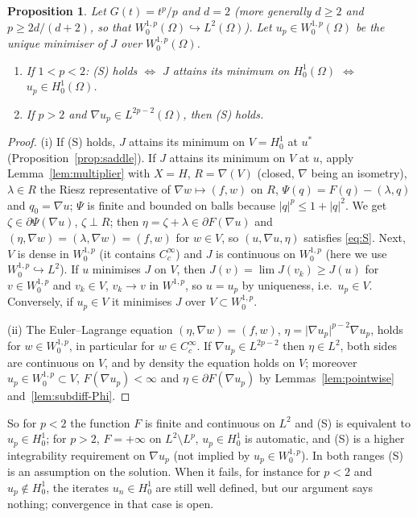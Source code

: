 \documentclass[11pt]{amsart}
\newtheorem{proposition}[theorem]{Proposition}
\theoremstyle{definition}
\theoremstyle{remark}
\numberwithin{equation}{section}
\newcommand{\abs}[1]{\lvert #1\rvert}
\begin{document}
\begin{proposition}\label{prop:S-p}
Let $G(t)=t^p/p$ and $d=2$ \textup(more generally $d\ge2$ and $p\ge2d/(d+2)$, so that $W^{1,p}_0(\Omega)\hookrightarrow L^2(\Omega)$\textup). Let $u_p\in W^{1,p}_0(\Omega)$ be the unique minimiser of $J$ over $W^{1,p}_0(\Omega)$.
\begin{enumerate}[label=\textup{(\roman*)}]
\item If $1<p<2$: \textup{(S)} holds $\iff$ $J$ attains its minimum on $H^1_0(\Omega)$ $\iff$ $u_p\in H^1_0(\Omega)$.
\item If $p>2$ and $\nabla u_p\in L^{2p-2}(\Omega)$, then \textup{(S)} holds.
\end{enumerate}
\end{proposition}
\begin{proof}
(i) If (S) holds, $J$ attains its minimum on $V=H^1_0$ at $u^*$ (Proposition~\ref{prop:saddle}). If $J$ attains its minimum on $V$ at $u$, apply Lemma~\ref{lem:multiplier} with $X=H$, $R=\nabla(V)$ (closed, $\nabla$ being an isometry), $\lambda\in R$ the Riesz representative of $\nabla w\mapsto(f,w)$ on $R$, $\Psi(q)=F(q)-(\lambda,q)$ and $q_0=\nabla u$; $\Psi$ is finite and bounded on balls because $\abs q^p\le1+\abs q^2$. We get $\zeta\in\partial\Psi(\nabla u)$, $\zeta\perp R$; then $\eta=\zeta+\lambda\in\partial F(\nabla u)$ and $(\eta,\nabla w)=(\lambda,\nabla w)=(f,w)$ for $w\in V$, so $(u,\nabla u,\eta)$ satisfies \eqref{eq:S}. Next, $V$ is dense in $W^{1,p}_0$ (it contains $C^\infty_c$) and $J$ is continuous on $W^{1,p}_0$ (here we use $W^{1,p}_0\hookrightarrow L^2$). If $u$ minimises $J$ on $V$, then $J(v)=\lim J(v_k)\ge J(u)$ for $v\in W^{1,p}_0$ and $v_k\in V$, $v_k\to v$ in $W^{1,p}$, so $u=u_p$ by uniqueness, i.e.\ $u_p\in V$. Conversely, if $u_p\in V$ it minimises $J$ over $V\subset W^{1,p}_0$.

(ii) The Euler--Lagrange equation $(\eta,\nabla w)=(f,w)$, $\eta=\abs{\nabla u_p}^{p-2}\nabla u_p$, holds for $w\in W^{1,p}_0$, in particular for $w\in C^\infty_c$. If $\nabla u_p\in L^{2p-2}$ then $\eta\in L^2$, both sides are continuous on $V$, and by density the equation holds on $V$; moreover $u_p\in W^{1,p}_0\subset V$, $F(\nabla u_p)<\infty$ and $\eta\in\partial F(\nabla u_p)$ by Lemmas~\ref{lem:pointwise} and~\ref{lem:subdiff-Phi}.
\end{proof}

So for $p<2$ the function $F$ is finite and continuous on $L^2$ and (S) is equivalent to $u_p\in H^1_0$; for $p>2$, $F=+\infty$ on $L^2\setminus L^p$, $u_p\in H^1_0$ is automatic, and (S) is a higher integrability requirement on $\nabla u_p$ (not implied by $u_p\in W^{1,p}_0$). In both ranges (S) is an assumption on the solution. When it fails, for instance for $p<2$ and $u_p\notin H^1_0$, the iterates $u_n\in H^1_0$ are still well defined, but our argument says nothing; convergence in that case is open.
\end{document}
